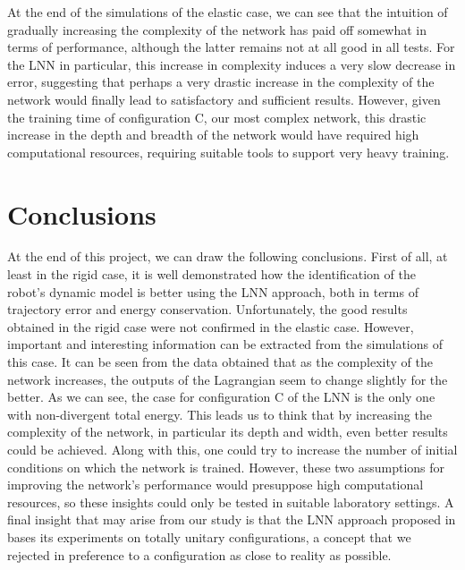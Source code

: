 \documentclass[a4paper]{article}
\begin{document}
At the end of the simulations of the elastic case, we can see that the intuition of gradually increasing the complexity of the network has paid off somewhat in terms of performance, although the latter remains not at all good in all tests. For the LNN in particular, this increase in complexity induces a very slow decrease in error, suggesting that perhaps a very drastic increase in the complexity of the network would finally lead to satisfactory and sufficient results. However, given the training time of configuration C, our most complex network, this drastic increase in the depth and breadth of the network would have required high computational resources, requiring suitable tools to support very heavy training.\\


\section{Conclusions}
At the end of this project, we can draw the following conclusions. First of all, at least in the rigid case, it is well demonstrated how the identification of the robot's dynamic model is better using the LNN approach, both in terms of trajectory error and energy conservation. Unfortunately, the good results obtained in the rigid case were not confirmed in the elastic case. However, important and interesting information can be extracted from the simulations of this case. It can be seen from the data obtained that as the complexity of the network increases, the outputs of the Lagrangian seem to change slightly for the better. As we can see, the case for configuration C of the LNN is the only one with non-divergent total energy. This leads us to think that by increasing the complexity of the network, in particular its depth and width, even better results could be achieved. Along with this, one could try to increase the number of initial conditions on which the network is trained. However, these two assumptions for improving the network's performance would presuppose high computational resources, so these insights could only be tested in suitable laboratory settings. A final insight that may arise from our study is that the LNN approach proposed in \cite{lnncranmer} bases its experiments on totally unitary configurations, a concept that we rejected in preference to a configuration as close to reality as possible.


\end{document}
